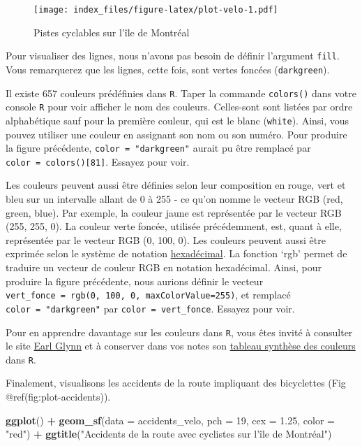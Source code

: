 \documentclass[]{article}
\newenvironment{Shaded}{\begin{snugshade}}{\end{snugshade}}
\newcommand{\KeywordTok}[1]{\textcolor[rgb]{0.13,0.29,0.53}{\textbf{#1}}}
\newcommand{\DataTypeTok}[1]{\textcolor[rgb]{0.13,0.29,0.53}{#1}}
\newcommand{\DecValTok}[1]{\textcolor[rgb]{0.00,0.00,0.81}{#1}}
\newcommand{\FloatTok}[1]{\textcolor[rgb]{0.00,0.00,0.81}{#1}}
\newcommand{\StringTok}[1]{\textcolor[rgb]{0.31,0.60,0.02}{#1}}
\newcommand{\OperatorTok}[1]{\textcolor[rgb]{0.81,0.36,0.00}{\textbf{#1}}}
\newcommand{\NormalTok}[1]{#1}
\begin{document}
\begin{figure}
\centering
\texttt{[image: index\_files/figure-latex/plot-velo-1.pdf]}
\caption{Pistes cyclables sur l'île de Montréal}
\end{figure}

Pour visualiser des lignes, nous n'avons pas besoin de définir
l'argument \texttt{fill}. Vous remarquerez que les lignes, cette fois,
sont vertes foncées (\texttt{darkgreen}).

Il existe 657 couleurs prédéfinies dans \texttt{R}. Taper la commande
\texttt{colors()} dans votre console \texttt{R} pour voir afficher le
nom des couleurs. Celles-sont sont listées par ordre alphabétique sauf
pour la première couleur, qui est le blanc (\texttt{white}). Ainsi, vous
pouvez utiliser une couleur en assignant son nom ou son numéro. Pour
produire la figure précédente, \texttt{color\ =\ "darkgreen"} aurait pu
être remplacé par \texttt{color\ =\ colors(){[}81{]}}. Essayez pour
voir.

Les couleurs peuvent aussi être définies selon leur composition en
rouge, vert et bleu sur un intervalle allant de 0 à 255 - ce qu'on nomme
le vecteur RGB (red, green, blue). Par exemple, la couleur jaune est
représentée par le vecteur RGB (255, 255, 0). La couleur verte foncée,
utilisée précédemment, est, quant à elle, représentée par le vecteur RGB
(0, 100, 0). Les couleurs peuvent aussi être exprimée selon le système
de notation
\href{https://fr.wikipedia.org/wiki/Syst\%C3\%A8me_hexad\%C3\%A9cimal}{hexadécimal}.
La fonction `rgb' permet de traduire un vecteur de couleur RGB en
notation hexadécimal. Ainsi, pour produire la figure précédente, nous
aurions définir le vecteur
\texttt{vert\_fonce\ =\ rgb(0,\ 100,\ 0,\ maxColorValue=255)}, et
remplacé \texttt{color\ =\ "darkgreen"} par
\texttt{color\ =\ vert\_fonce}. Essayez pour voir.

Pour en apprendre davantage sur les couleurs dans \texttt{R}, vous êtes
invité à consulter le site
\href{https://github.com/EarlGlynn/colorchart/wiki/Color-Chart-in-R}{Earl
Glynn} et à conserver dans vos notes son
\href{Module3/3_TableauCouleurs.pdf}{tableau synthèse des couleurs} dans
\texttt{R}.

Finalement, visualisons les accidents de la route impliquant des
bicyclettes (Fig @ref(fig:plot-accidents)).

\begin{Shaded}
\begin{Highlighting}[]
\KeywordTok{ggplot}\NormalTok{() }\OperatorTok{+}
\KeywordTok{geom_sf}\NormalTok{(}\DataTypeTok{data =}\NormalTok{ accidents_velo, }\DataTypeTok{pch =} \DecValTok{19}\NormalTok{, }\DataTypeTok{cex =} \FloatTok{1.25}\NormalTok{, }\DataTypeTok{color =} \StringTok{"red"}\NormalTok{) }\OperatorTok{+}
\KeywordTok{ggtitle}\NormalTok{(}\StringTok{"Accidents de la route avec cyclistes sur l'île de Montréal"}\NormalTok{)}
\end{Highlighting}
\end{Shaded}
\end{document}

